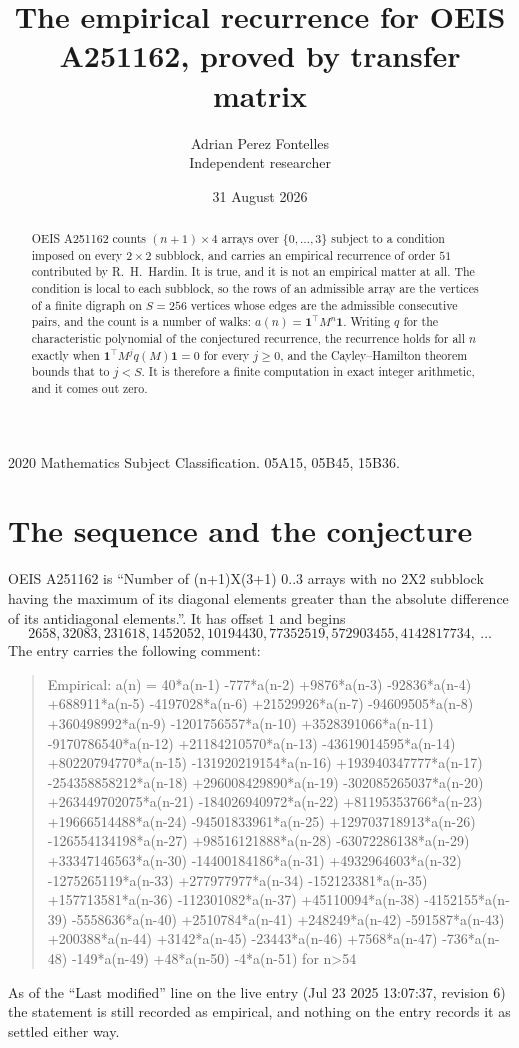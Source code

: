 \documentclass[11pt,a4paper]{article}
\title{The empirical recurrence for OEIS A251162, proved by transfer matrix}
\author{Adrian Perez Fontelles\\ \small Independent researcher}
\date{31 August 2026}
\theoremstyle{plain}
\theoremstyle{definition}
\begin{document}
\maketitle

\begin{abstract}
OEIS A251162 counts $(n+1)\times4$ arrays over $\{0,\dots,3\}$ subject to a condition imposed on
every $2\times2$ subblock, and carries an empirical recurrence of order $51$ contributed
by R.~H.~Hardin. It is true, and it is not an empirical matter at all. The condition is local
to each subblock, so the rows of an admissible array are the vertices of a finite digraph
on $S=256$ vertices whose edges are the admissible consecutive pairs, and the count is a
number of walks: $a(n)=\mathbf{1}^{\!\top}M^{n}\mathbf{1}$. Writing $q$
for the characteristic polynomial of the conjectured recurrence, the recurrence holds for all
$n$ exactly when $\mathbf{1}^{\!\top}M^{j}q(M)\mathbf{1}=0$ for every $j\ge0$, and the
Cayley--Hamilton theorem bounds that to $j<S$. It is therefore a finite computation in exact
integer arithmetic, and it comes out zero.
\end{abstract}

\noindent\small 2020 Mathematics Subject Classification. 05A15, 05B45, 15B36.\normalsize

\section{The sequence and the conjecture}

OEIS A251162 is ``Number of (n+1)X(3+1) 0..3 arrays with no 2X2 subblock having the maximum of its diagonal elements greater than the absolute difference of its antidiagonal elements.''. It has offset $1$ and begins
\[
2658, 32083, 231618, 1452052, 10194430, 77352519, 572903455, 4142817734,\ \dots
\]
The entry carries the following comment:
\begin{quote}\small
Empirical: a(n) = 40*a(n-1) -777*a(n-2) +9876*a(n-3) -92836*a(n-4) +688911*a(n-5) -4197028*a(n-6) +21529926*a(n-7) -94609505*a(n-8) +360498992*a(n-9) -1201756557*a(n-10) +3528391066*a(n-11) -9170786540*a(n-12) +21184210570*a(n-13) -43619014595*a(n-14) +80220794770*a(n-15) -131920219154*a(n-16) +193940347777*a(n-17) -254358858212*a(n-18) +296008429890*a(n-19) -302085265037*a(n-20) +263449702075*a(n-21) -184026940972*a(n-22) +81195353766*a(n-23) +19666514488*a(n-24) -94501833961*a(n-25) +129703718913*a(n-26) -126554134198*a(n-27) +98516121888*a(n-28) -63072286138*a(n-29) +33347146563*a(n-30) -14400184186*a(n-31) +4932964603*a(n-32) -1275265119*a(n-33) +277977977*a(n-34) -152123381*a(n-35) +157713581*a(n-36) -112301082*a(n-37) +45110094*a(n-38) -4152155*a(n-39) -5558636*a(n-40) +2510784*a(n-41) +248249*a(n-42) -591587*a(n-43) +200388*a(n-44) +3142*a(n-45) -23443*a(n-46) +7568*a(n-47) -736*a(n-48) -149*a(n-49) +48*a(n-50) -4*a(n-51) for n>54
\end{quote}
As of the ``Last modified'' line on the live entry (Jul 23 2025 13:07:37, revision 6) the statement is
still recorded as empirical, and nothing on the entry records it as settled either way.
\end{document}
